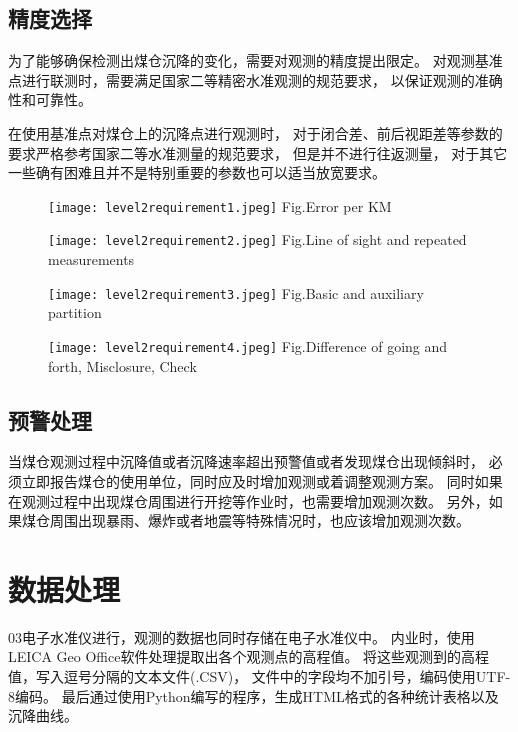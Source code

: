\subsection{精度选择}
为了能够确保检测出煤仓沉降的变化，需要对观测的精度提出限定。
对观测基准点进行联测时，需要满足国家二等精密水准观测的规范要求，
以保证观测的准确性和可靠性。

在使用基准点对煤仓上的沉降点进行观测时，
对于闭合差、前后视距差等参数的要求严格参考国家二等水准测量的规范要求，
但是并不进行往返测量，
对于其它一些确有困难且并不是特别重要的参数也可以适当放宽要求。
\begin{figure}[!htbp]
   \centering
   \texttt{[image: level2requirement1.jpeg]}
								{Fig.}{Error per KM}
\end{figure}

\begin{figure}[!htbp]
   \centering
   \texttt{[image: level2requirement2.jpeg]}
						{Fig.}{Line of sight and repeated measurements}
\end{figure}

\begin{figure}[!htbp]
   \centering
   \texttt{[image: level2requirement3.jpeg]}
								{Fig.}{Basic and auxiliary partition}
\end{figure}

\begin{figure}[!htbp]
   \centering
   \texttt{[image: level2requirement4.jpeg]}
			{Fig.}{Difference of going and forth, Misclosure, Check}
\end{figure}

\newpage
\subsection{预警处理}
当煤仓观测过程中沉降值或者沉降速率超出预警值或者发现煤仓出现倾斜时，
必须立即报告煤仓的使用单位，同时应及时增加观测或着调整观测方案。
同时如果在观测过程中出现煤仓周围进行开挖等作业时，也需要增加观测次数。
另外，如果煤仓周围出现暴雨、爆炸或者地震等特殊情况时，也应该增加观测次数。


\section{数据处理}
03电子水准仪进行，观测的数据也同时存储在电子水准仪中。
内业时，使用LEICA Geo Office软件处理提取出各个观测点的高程值。
将这些观测到的高程值，写入逗号分隔的文本文件(.CSV)，
文件中的字段均不加引号，编码使用UTF-8编码。
最后通过使用Python编写的程序，生成HTML格式的各种统计表格以及沉降曲线。

